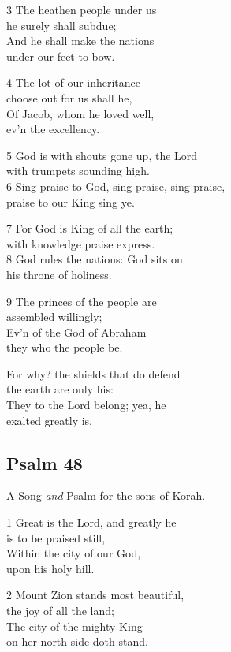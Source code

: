 3 The heathen people under us\\
he surely shall subdue;\\
And he shall make the nations\\
under our feet to bow.

4 The lot of our inheritance\\
choose out for us shall he,\\
Of Jacob, whom he loved well,\\
ev’n the excellency.

5 God is with shouts gone up, the Lord\\
with trumpets sounding high.\\
6 Sing praise to God, sing praise, sing praise,\\
praise to our King sing ye.

7 For God is King of all the earth;\\
with knowledge praise express.\\
8 God rules the nations: God sits on\\
his throne of holiness.

9 The princes of the people are\\
assembled willingly;\\
Ev’n of the God of Abraham\\
they who the people be.

For why? the shields that do defend\\
the earth are only his:\\
They to the Lord belong; yea, he\\
exalted greatly is.

\begin{center}
\quad{}\quad{}
\end{center}

\subsection*{Psalm 48}

A Song \emph{and} Psalm for the sons of Korah.

1 Great is the Lord, and greatly he\\
is to be praised still,\\
Within the city of our God,\\
upon his holy hill.

2 Mount Zion stands most beautiful,\\
the joy of all the land;\\
The city of the mighty King\\
on her north side doth stand.

